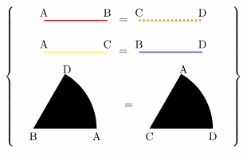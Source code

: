 \documentclass{article}
\begin{document}
\[
\left\{
\begin{array}{c}
\begin{array}{c}
\begin{tikzpicture}
    \draw[thick, red] (0, 0) -- (2, 0);
    \node[anchor=south] at (0, 0) {\textcolor{black}{A}};
    \node[anchor=south] at (2, 0) {\textcolor{black}{B}};
    \node at (2.5, 0) {$=$};
    \draw[ultra thick, dotted, orange] (3, 0) -- (5, 0);
    \node[anchor=south] at (3, 0) {\textcolor{black}{C}};
    \node[anchor=south] at (5, 0) {\textcolor{black}{D}};

    \draw[thick, yellow] (0, -1) -- (2, -1);
    \node[anchor=south] at (0, -1) {\textcolor{black}{A}};
    \node[anchor=south] at (2, -1) {\textcolor{black}{C}};
    \node at (2.5, -1) {$=$};
    \draw[thick, blue] (3, -1) -- (5, -1);
    \node[anchor=south] at (3, -1) {\textcolor{black}{B}};
    \node[anchor=south] at (5, -1) {\textcolor{black}{D}};
\end{tikzpicture}

\end{array}
\\ %
\begin{array}{c}
\begin{tikzpicture}
    \fill[black]
    (0,0) coordinate (A)
    -- (2,0) coordinate (B)
    arc[start angle=0, end angle=60, radius=2]
    -- cycle;
    \node[below] at (A) {B};
    \node[below] at (B) {A};
    \node[below left] at (58:2.5) {D};
\end{tikzpicture}
\end{array}
\quad =
\begin{array}{c}
\begin{tikzpicture}
    \fill[black]
    (0,0) coordinate (A)
    -- (2,0) coordinate (B)
    arc[start angle=0, end angle=60, radius=2]
    -- cycle;
    \node[below] at (A) {C};
    \node[below] at (B) {D};
    \node[below left] at (58:2.5) {A};
\end{tikzpicture}
\end{array}
\end{array}
\right\}
\]
\centering
\end{document}
